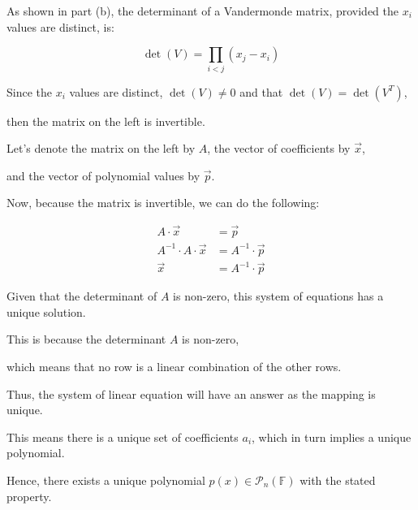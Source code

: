 \documentclass{report}
\begin{document}
{	As shown in part (b), the determinant of a Vandermonde matrix, provided the \(x_i\) values are distinct, is:

	\[
		\det(V) = \prod_{i < j} (x_{j} - x_{i})
	\]

	Since the \(x_i\) values are distinct, \(\det(V) \neq 0\) and that \(\det(V) = \det(V^{T})\),

	then the matrix on the left is invertible.

	Let's denote the matrix on the left by \(A\), the vector of coefficients by \(\vec{x}\),

	and the vector of polynomial values by \(\vec{p}\).

	Now, because the matrix is invertible, we can do the following:

	\begin{align*}
		A \cdot \vec{x}              & = \vec{p}              \\
		A^{-1} \cdot A \cdot \vec{x} & = A^{-1} \cdot \vec{p} \\
		\vec{x}                      & = A^{-1} \cdot \vec{p}
	\end{align*}

	Given that the determinant of \(A\) is non-zero, this system of equations has a unique solution.

	This is because the determinant \(A\) is non-zero,

	which means that no row is a linear combination of the other rows.

	Thus, the system of linear equation will have an answer as the mapping is unique.

	This means there is a unique set of coefficients \(a_i\), which in turn implies a unique polynomial.

	Hence, there exists a unique polynomial \(p(x) \in \mathcal{P}_{n}(\mathbb{F})\) with the stated property.
}



\end{document}
